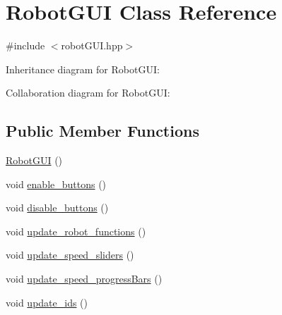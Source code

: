 \hypertarget{class_robot_g_u_i}{}\section{Robot\+G\+UI Class Reference}
\label{class_robot_g_u_i}


{\ttfamily \#include $<$robot\+G\+U\+I.\+hpp$>$}



Inheritance diagram for Robot\+G\+UI\+:


Collaboration diagram for Robot\+G\+UI\+:
\subsection*{Public Member Functions}
\begin{DoxyCompactItemize}
\item 
\hyperlink{class_robot_g_u_i_a6e5874c7d6304555c48b08bd9c381253}{Robot\+G\+UI} ()
\item 
void \hyperlink{class_robot_g_u_i_a01f52178c89f4bbb7b0c5ba4c1b709d0}{enable\+\_\+buttons} ()
\item 
void \hyperlink{class_robot_g_u_i_aaed4d5a44833dc435ac8f9e2faad58b7}{disable\+\_\+buttons} ()
\item 
void \hyperlink{class_robot_g_u_i_a88e9422aa99db2dd70403650ab1551a4}{update\+\_\+robot\+\_\+functions} ()
\item 
void \hyperlink{class_robot_g_u_i_a7e7796fabb839c7eea5f82387fd10359}{update\+\_\+speed\+\_\+sliders} ()
\item 
void \hyperlink{class_robot_g_u_i_aeb4d6cd3764ae5d1d7a24a5565aa42cb}{update\+\_\+speed\+\_\+progress\+Bars} ()
\item 
void \hyperlink{class_robot_g_u_i_adb3915e1e117c2d3c1b66607c793819f}{update\+\_\+ids} ()
\end{DoxyCompactItemize}
